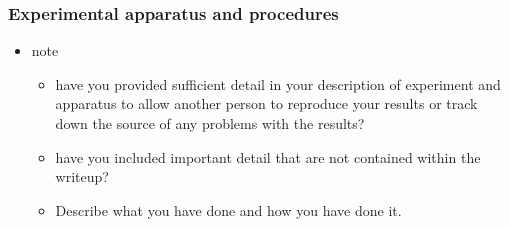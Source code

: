 \documentclass[11pt]{article}
\begin{document}
\subsubsection{Experimental apparatus and procedures}
\label{sec:org7d1299a}
\begin{itemize}
\item note
\begin{itemize}
\item have you provided sufficient detail in your description of experiment and apparatus to allow another person to reproduce your results or track down the source of any problems with the results?
\item have you included important detail that are not contained within the writeup?
\item Describe what you have done and how you have done it.
\end{itemize}
\end{itemize}
\end{document}
